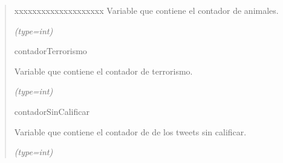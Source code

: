 \begin{boxedminipage}{\funcwidth}
\begin{quote}
\begin{Ventry}{xxxxxxxxxxxxxxxxxxxx}
          Variable que contiene el contador de animales.

            {\it (type=int)}

          \item[contadorTerrorismo]

          Variable que contiene el contador de terrorismo.

            {\it (type=int)}

          \item[contadorSinCalificar]

          Variable que contiene el contador de de los tweets sin calificar.

            {\it (type=int)}

        \end{Ventry}

      \end{quote}

    \end{boxedminipage}

    \label{funcionesTwitter:FuncionesTwitter:escribirTweetsClasificados}

    \vspace{0.5ex}

